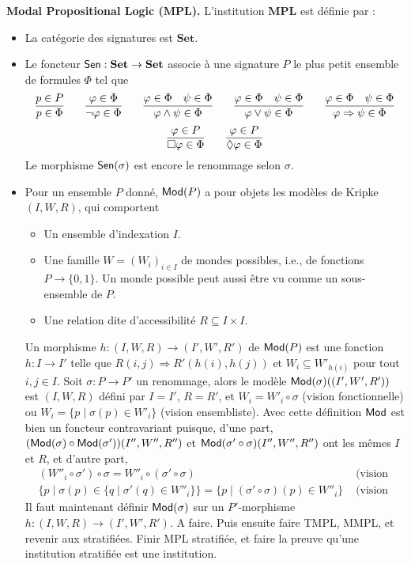 \documentclass[11pt,a4paper]{article}
\newcommand{\ph}{\varphi}
\newcommand{\itemz}{\item[$\triangleright$]}
\newcommand{\gr}{\textbf}
\newcommand{\info}[1]{\text{{\fontfamily{lmss}\selectfont #1}}}
\newcommand{\Mod}{\info{Mod}}
\newcommand{\Sen}{\info{Sen}}
\newcommand{\1}{\mathbbm{1}}
\begin{document}
\gr{Modal Propositional Logic ($\gr{MPL}$).} L'institution $\gr{MPL}$ est définie par :
\begin{itemize}
\itemz La catégorie des signatures est $\gr{Set}$.
\itemz Le foncteur $\Sen : \gr{Set} \to \gr{Set}$ associe à une signature $P$ le plus petit ensemble de formules $\Phi$ tel que
$$
\infer{p \in \Phi}{p \in P}
\qquad
\infer{\neg \ph \in \Phi}{\ph \in \Phi}
\qquad
\infer{\ph \wedge \psi \in \Phi}{\ph \in \Phi & \psi \in \Phi }
\qquad
\infer{\ph \vee \psi \in \Phi}{\ph \in \Phi & \psi \in \Phi }
\qquad
\infer{\ph \Rightarrow \psi \in \Phi}{\ph \in \Phi & \psi \in \Phi }
$$
$$
\infer{\square \ph \in \Phi}{\ph \in P}
\qquad
\infer{\lozenge \ph \in \Phi}{\ph \in P}
$$
Le morphisme $\Sen(\sigma)$ est encore le renommage selon $\sigma$.
\itemz Pour un ensemble $P$ donné, $\Mod(P)$ a pour objets les modèles de Kripke $(I,W,R)$, qui comportent
\begin{itemize}
\setlength\itemsep{-0.3em}
\item Un ensemble d'indexation $I$.
\item Une famille $W = (W_i)_{i\in I}$ de mondes possibles, i.e., de fonctions $P \to \{ 0,1 \}$. Un monde possible peut aussi être vu comme un sous-ensemble de $P$.
\item Une relation dite d'accessibilité $R \subseteq I \times I$.
\end{itemize}
Un morphisme $h : (I,W,R) \to (I',W',R')$ de $\Mod(P)$ est une fonction $h : I \to I'$ telle que $R(i,j) \Rightarrow R'(h(i),h(j))$ et $W_i \subseteq W'_{h(i)}$ pour tout $i,j \in I$. Soit $\sigma : P \to P'$ un renommage, alors le modèle $\Mod(\sigma)((I',W',R'))$ est $(I,W,R)$ défini par $I = I'$, $R = R'$, et $W_i = W'_i \circ \sigma$ (vision fonctionnelle) ou $W_i = \{ p \mid \sigma(p) \in W'_i \}$ (vision ensembliste). Avec cette définition $\Mod$ est bien un foncteur contravariant puisque, d'une part, $(\Mod(\sigma) \circ \Mod(\sigma')) (I'',W'',R'')$ et $\Mod(\sigma' \circ \sigma)(I'',W'',R'')$ ont les mêmes $I$ et $R$, et d'autre part,
\begin{align*}
&(W''_i \circ \sigma') \circ \sigma = W''_i \circ (\sigma' \circ \sigma) &\text{ (vision fonctionnelle)}\\
&  \{ p \mid \sigma(p) \in \{ q \mid \sigma'(q) \in W''_i \}\} = \{ p \mid (\sigma' \circ \sigma)(p) \in W''_i \} & \text{ (vision ensembliste)}
\end{align*}
Il faut maintenant définir $\Mod(\sigma)$ sur un $P'$-morphisme $h : (I,W,R) \to (I',W',R')$.{\color{purple} A faire. Puis ensuite faire TMPL, MMPL, et revenir aux stratifiées. Finir MPL stratifiée, et faire la preuve qu'une institution stratifiée est une institution.}

\end{itemize}
\end{document}

